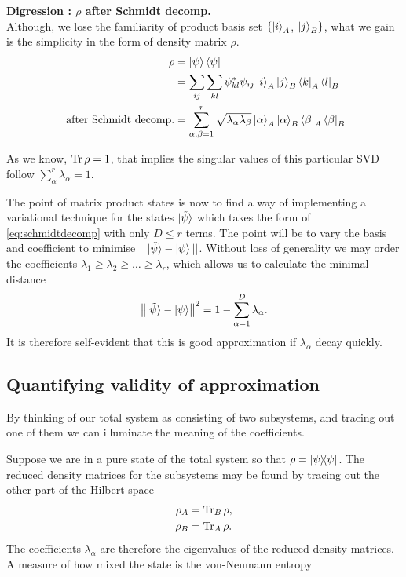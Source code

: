 \documentclass[a4paper]{article}
\begin{document}
\hrulefill

\noindent\textbf{Digression : $\rho$ after Schmidt decomp.}\\

\noindent Although, we lose the familiarity of product basis set $ \{ \ket{i}_A$, $\ket{j}_B \}$, what we gain is the
simplicity in the form of density matrix $\rho$. 
\begin{align*}
\rho &= \ket{\psi} \bra{\psi} \\
&= \sum_{ij}\sum_{kl} \psi^{*}_{kl} \psi_{ij} \ket{i}_{A}\ket{j}_{B} \bra{k}_{A} \bra{l}_{B}\\\
\text{after Schmidt decomp.} &= \sum_{\alpha,\beta=1}^r \sqrt{\lambda_\alpha\lambda_\beta}\ket{\alpha}_{A}\ket{\alpha}_{B} \bra{\beta}_{A} \bra{\beta}_{B} \\
\end{align*}

As we know, $\operatorname{Tr} \rho = 1$, that implies the singular values of this particular SVD follow $\sum_\alpha^{r} \lambda_\alpha = 1$.

\hrulefill
\vspace{0.5cm}

The point of matrix product states is now to find a way of implementing
a variational technique for the  states $\ket{\tilde{\psi}}$
which takes the form of \eqref{eq:schmidtdecomp} with only $D\leq r$ terms. The
point will be to vary the basis and coefficient to minimise
$||\ket{\tilde{\psi}}-\ket{\psi}||$.
Without loss of generality we may order the coefficients $\lambda_1\geq
\lambda_2\geq\dots \geq \lambda_r$, which allows us to calculate the minimal
distance
\[ 
\left\lVert\ket{\tilde{\psi}}-\ket{\psi}\right\rVert^2=1-\sum_{\alpha=1}^D \lambda_\alpha.
\]
It is therefore self-evident that this is good approximation if $\lambda_\alpha$ decay quickly.

\subsection{Quantifying validity of approximation}
By thinking of our total system as consisting of two subsystems, and tracing out
one of them we can illuminate the meaning of the coefficients.
\begin{center}
\end{center}
Suppose we are in a pure state of the total system so that
$\rho=\ket{\psi}\!\!\bra{\psi}$. The reduced density matrices for the subsystems may
be found by tracing out the other part of the Hilbert space 
\begin{align*}
\rho_A&=\operatorname{Tr}_B \rho,\\
\rho_B&=\operatorname{Tr}_A \rho.
\end{align*}
The coefficients $\lambda_\alpha$ are therefore the eigenvalues of the reduced density matrices.
A measure of how mixed the state is the von-Neumann entropy
\end{document}
